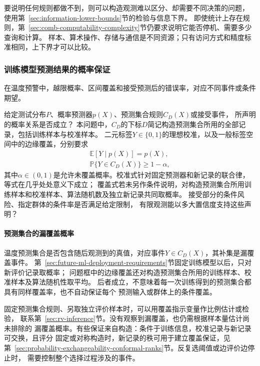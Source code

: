 要说明任何规则都做不到，则可以构造观测难以区分、却需要不同决策的问题，
使用第~\ref{sec:information-lower-bounds}节的检验与信息下界。
即使统计上存在规则，第~\ref{sec:comb-computability-complexity}节仍要求说明它能否停机、需要多少查询和计算。
样本、算术操作、存储与通信是不同资源；只有访问方式和精度标准相同，上下界才可以比较。

\subsubsection{训练模型预测结果的概率保证}
\label{sec:future-analysis-reliability}

在温度预警中，越限概率、区间覆盖和接受预测后的错误率，对应不同事件或条件期望。

\begin{mathproblem}[预测与决策的概率关系是否满足要求]
  \label{question:future-reliability}
  给定测试分布$P$、概率预测器$p(X)$、预测集合规则$C_D(X)$或接受事件，
  所声明的概率关系是否成立？
  本问题中，$C_D$的下标$D$简记构造预测集合所用的全部记录，包括训练样本与校准样本。
  二元标签$Y\in\{0,1\}$的理想校准，以及一般标签空间中的边缘覆盖，分别要求
  \[
    \begin{gathered}
      \mathbb E[Y\mid p(X)]=p(X),\\
      \mathbb P\{Y\in C_D(X)\}\geq1-\alpha,
    \end{gathered}
  \]
  其中$\alpha\in(0,1)$是允许未覆盖概率。校准式针对固定预测器和新记录的联合律，等式在几乎处处意义下成立；
  覆盖式若未另作条件说明，对构造预测集合所用训练样本和校准样本、算法随机数及独立新记录共同取概率。
  接受部分的条件风险、指定群体的条件率是否满足给定限制，
  有限观测能以多大置信度支持这些声明？
\end{mathproblem}

\paragraph{预测集合的漏覆盖概率}

温度预测集合是否包含随后观测到的真值，对应事件$Y\in C_D(X)$，其补集是漏覆盖事件。
第~\ref{sec:future-ml-deployment-requirements}节固定训练模型以后，只对新评价记录取概率；
问题框中的边缘覆盖还对构造预测集合所用的训练样本、校准样本及算法随机性取平均。
后者成立，不意味着每一次训练得到的预测集合都具有同样覆盖率，也不自动保证每个
预测输入或群体上的条件覆盖。

固定预测集合规则、另取独立评价样本时，可以用覆盖指示变量作比例估计或检验，
联系第~\ref{sec:rv-inference}节。没有观察到漏覆盖，也仍需根据样本量估计尚未排除的
漏覆盖概率。有些保证来自构造：条件于训练信息，校准记录与新记录可交换，且评分
固定或对称构造时，新记录的秩可用于建立覆盖保证，见
第~\ref{sec:probability-exchangeability-conformal-ranks}节。反复选阈值或边评价边停止时，
需要控制整个选择过程涉及的事件。

